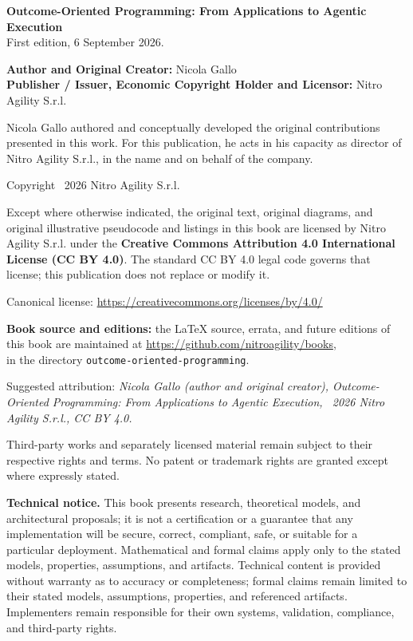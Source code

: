 \documentclass[10pt,oneside,openany]{book}
\newcommand{\mono}[1]{\texttt{#1}}
\begin{document}
{\small\setlength{\parskip}{3.6pt}
\textbf{Outcome-Oriented Programming: From Applications to Agentic Execution}\\
First edition, 6 September 2026.\par

\textbf{Author and Original Creator:} Nicola Gallo\\
\textbf{Publisher / Issuer, Economic Copyright Holder and Licensor:} Nitro Agility S.r.l.\par

Nicola Gallo authored and conceptually developed the original contributions presented in this work. For this publication, he acts in his capacity as director of Nitro Agility S.r.l., in the name and on behalf of the company.\par

Copyright \textcopyright\ 2026 Nitro Agility S.r.l.\par

Except where otherwise indicated, the original text, original diagrams, and original illustrative pseudocode and listings in this book are licensed by Nitro Agility S.r.l. under the \textbf{Creative Commons Attribution 4.0 International License (CC BY 4.0)}. The standard CC BY 4.0 legal code governs that license; this publication does not replace or modify it.\par

Canonical license: \url{https://creativecommons.org/licenses/by/4.0/}\par

\textbf{Book source and editions:} the LaTeX source, errata, and future editions of this book are maintained at \url{https://github.com/nitroagility/books},\\
in the directory \mono{outcome-oriented-programming}.\par

Suggested attribution: \emph{Nicola Gallo (author and original creator), Outcome-Oriented Programming: From Applications to Agentic Execution, \textcopyright\ 2026 Nitro Agility S.r.l., CC BY 4.0.}\par

Third-party works and separately licensed material remain subject to their respective rights and terms. No patent or trademark rights are granted except where expressly stated.\par

\textbf{Technical notice.} This book presents research, theoretical models, and architectural proposals; it is not a certification or a guarantee that any implementation will be secure, correct, compliant, safe, or suitable for a particular deployment. Mathematical and formal claims apply only to the stated models, properties, assumptions, and artifacts. Technical content is provided without warranty as to accuracy or completeness; formal claims remain limited to their stated models, assumptions, properties, and referenced artifacts. Implementers remain responsible for their own systems, validation, compliance, and third-party rights.\par

}
\end{document}
